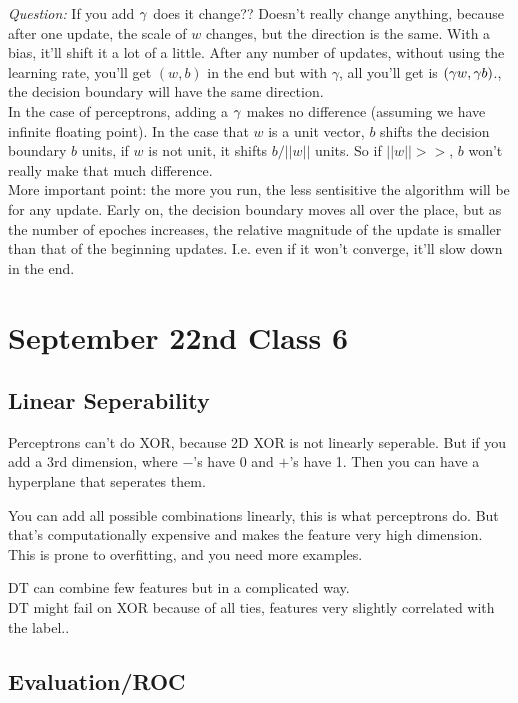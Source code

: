 \emph{Question:} If you add $\gamma$ does it change?? Doesn't really change anything,
because after one update, the scale of $w$ changes, but the direction
is the same. With a bias, it'll shift it a lot of a little. 
After any number of updates, without using the learning rate, you'll
get $(w,b)$ in the end but with $\gamma$, all you'll get is $(\gamma w,
\gamma b)$., the decision boundary will have the same direction.\\
In the case of perceptrons, adding a $\gamma$ makes no difference
(assuming we have infinite floating point). In the case that $w$ is a
unit vector, $b$ shifts the decision boundary $b$ units, if $w$ is not
unit, it shifts $b/||w||$ units. So if $||w||>>$, $b$ won't really
make that much difference.\\
More important point: the more you run, the less sentisitive the
algorithm will be for any update. Early on, the decision boundary
moves all over the place, but as the number of epoches increases, the
relative magnitude of the update is smaller than that of the beginning
updates. I.e. even if it won't converge, it'll slow down in the end.

\pagebreak
\section{September 22nd Class 6}
\label{sec:class6}

\subsection{Linear Seperability}
\label{sec:perceptron2}

Perceptrons can't do XOR, because 2D XOR is not linearly
seperable. But if you add a 3rd dimension, where $-$'s have 0 and
$+$'s have 1. Then you can have a hyperplane that seperates them.

You can add all possible combinations linearly, this is what
perceptrons do. But that's computationally expensive and makes the
feature very high dimension. This is prone to overfitting, and you
need more examples.

DT can combine few features but in a complicated way.\\
DT might fail on XOR because of all ties, features very slightly
correlated with the label..

\subsection{Evaluation/ROC}
\label{sec:roc}

